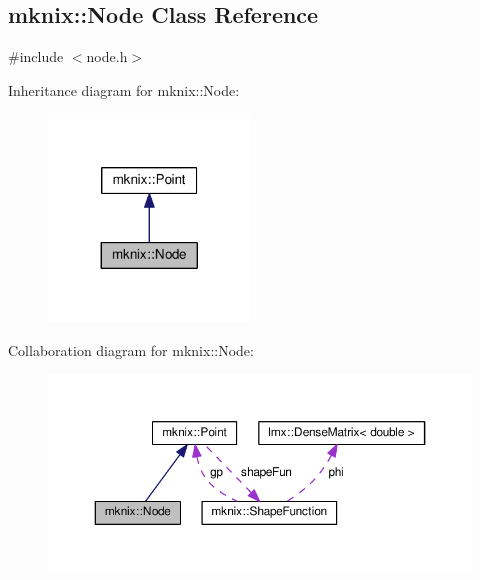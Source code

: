\hypertarget{classmknix_1_1_node}{}\subsection{mknix\+:\+:Node Class Reference}
\label{classmknix_1_1_node}


{\ttfamily \#include $<$node.\+h$>$}



Inheritance diagram for mknix\+:\+:Node\+:\nopagebreak
\begin{figure}[H]
\begin{center}
\leavevmode
\includegraphics[width=152pt]{d0/de4/classmknix_1_1_node__inherit__graph}
\end{center}
\end{figure}


Collaboration diagram for mknix\+:\+:Node\+:\nopagebreak
\begin{figure}[H]
\begin{center}
\leavevmode
\includegraphics[width=350pt]{de/d85/classmknix_1_1_node__coll__graph}
\end{center}
\end{figure}
